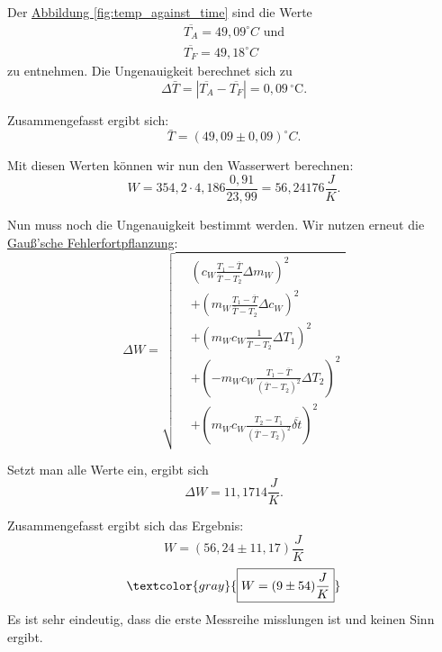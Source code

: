 Der \hyperref[fig:temp_against_time]{Abbildung \ref*{fig:temp_against_time}} sind die Werte
\begin{align}
    \overline{T_A} = 49,09^\circ C  \text{ und}\\
    \overline{T_F} = 49,18^\circ C
\end{align}
zu entnehmen. Die Ungenauigkeit berechnet sich zu
\begin{equation}
    \Delta \bar{T} = \left| \overline{T_A} - \overline{T_F} \right| = 0,09 \, \mathrm{^\circ C}.
\end{equation}

Zusammengefasst ergibt sich:
\begin{equation}
    \bar{T} = (49,09 \pm 0,09) ^\circ C.
\end{equation}

Mit diesen Werten können wir nun den Wasserwert berechnen:
\begin{equation}
    W = 354,2 \cdot 4,186 \frac{0,91}{23,99} = 56,24176 \frac{J}{K}.
\end{equation}

Nun muss noch die Ungenauigkeit bestimmt werden. Wir nutzen erneut die \hyperref[eq:gauss_fehlfortpflanzung]{Gauß'sche Fehlerfortpflanzung}:
\begin{equation}
    \Delta W = 
    \sqrt{
    \begin{aligned}
    &\left( c_W \frac{T_1 - \overline{T}}{\overline{T} - T_2} \Delta m_W \right)^2 \\
    &+ \left( m_W \frac{T_1 - \overline{T}}{\overline{T} - T_2} \Delta c_W \right)^2 \\
    &+ \left( m_W c_W \frac{1}{\overline{T} - T_2} \Delta T_1 \right)^2 \\
    &+ \left( - m_W c_W \frac{T_1 - \overline{T}}{(\overline{T} - T_2)^2} \Delta T_2 \right)^2 \\
    &+ \left( m_W c_W \frac{T_2 - T_1}{(\overline{T} - T_2)^2} \overline{\delta t} \right)^2
    \end{aligned}
    }
    \label{eq:deltaW}
\end{equation}

Setzt man alle Werte ein, ergibt sich
\begin{equation}
    \Delta W = 11,1714 \frac{J}{K}.
\end{equation}

Zusammengefasst ergibt sich das Ergebnis:
\begin{equation}
    \boxed{W = (56,24 \pm 11,17) \frac{J}{K}}
\end{equation}
\begin{equation*}
    \textcolor{gray}{
        \boxed{W = (9 \pm 54) \frac{J}{K}}
    }
\end{equation*}
Es ist sehr eindeutig, dass die erste Messreihe misslungen ist und keinen Sinn ergibt.

